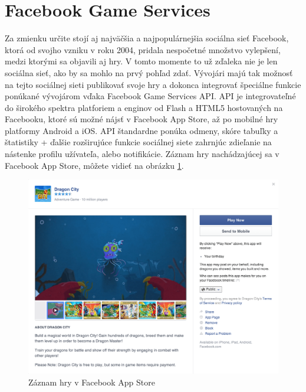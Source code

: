 \section{Facebook Game Services}
Za zmienku určite stojí aj najväčšia a najpopulárnejšia sociálna sieť Facebook, ktorá od svojho vzniku v roku 2004, pridala nespočetné množstvo vylepšení, medzi ktorými sa objavili aj hry. V tomto momente to už zďaleka nie je len sociálna sieť, ako by sa mohlo na prvý pohľad zdať. Vývojári majú tak možnosť na tejto sociálnej sieti publikovať svoje hry a dokonca integrovať špeciálne funkcie ponúkané vývojárom vďaka Facebook Game Services API. API je integrovateľné do širokého spektra platforiem a enginov od Flash a HTML5 hostovaných na Facebooku, ktoré sú možné nájsť v Facebook App Store, až po mobilné hry platformy Android a iOS. API štandardne ponúka odmeny, skóre tabuľky a štatistiky + ďalšie rozširujúce funkcie sociálnej siete zahrnjúc zdieľanie na nástenke profilu užívateľa, alebo notifikácie. Záznam hry nachádzajúcej sa v Facebook App Store, môžete vidieť na obrázku \ref{fig:facebook}. \cite{facebook-developers}
\begin{figure}[h]
  \centering
  \includegraphics[scale=0.17]{fig/facebook.png}
  \caption{Záznam hry v Facebook App Store}
  \label{fig:facebook}
\end{figure}

